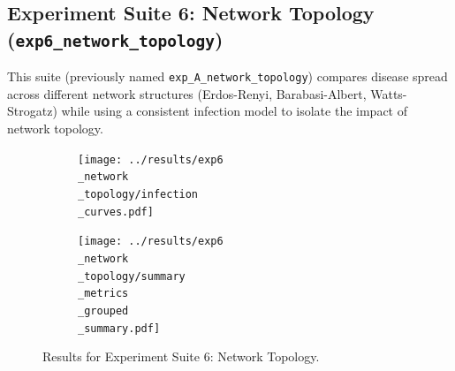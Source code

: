 \documentclass[12pt]{article}
\begin{document}
\subsection[Exp Suite 6: Network Topology]{Experiment Suite 6: Network Topology (\texttt{exp6\_net\-work\_to\-pol\-o\-gy})}
This suite (previously named \texttt{exp\_A\_network\_topology}) compares disease spread across different network structures (Erdos-Renyi, Barabasi-Albert, Watts-Strogatz) while using a consistent infection model to isolate the impact of network topology. \begin{figure}[htbp!] \centering \begin{subfigure}{.48\textwidth} \centering \texttt{[image: ../results/exp6\\\_network\\\_topology/infection\\\_curves.pdf]} 
 \label{fig:exp6_curves} \end{subfigure} \hfill \begin{subfigure}{.48\textwidth} \centering \texttt{[image: ../results/exp6\\\_network\\\_topology/summary\\\_metrics\\\_grouped\\\_summary.pdf]} 
 \label{fig:exp6_summary} \end{subfigure} \caption[Exp Suite 6 Results]{Results for Experiment Suite 6: Network Topology.} \label{fig:exp6_results} \end{figure}
\begin{table}[H]
\centering
\caption{Summary Metrics for Experiment Suite 6: Network Topology}
\label{tab:exp6_metrics}
\end{table}
\end{document}
